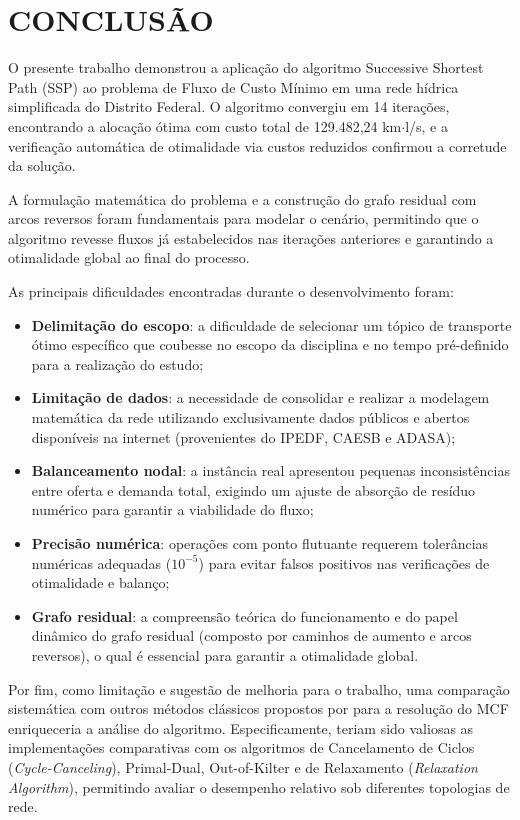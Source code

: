 \newpage

\section{CONCLUSÃO}

O presente trabalho demonstrou a aplicação do algoritmo Successive Shortest Path (SSP) ao problema de Fluxo de Custo Mínimo em uma rede hídrica simplificada do Distrito Federal. O algoritmo convergiu em 14 iterações, encontrando a alocação ótima com custo total de 129.482,24 km$\cdot$l/s, e a verificação automática de otimalidade via custos reduzidos confirmou a corretude da solução.

A formulação matemática do problema e a construção do grafo residual com arcos reversos foram fundamentais para modelar o cenário, permitindo que o algoritmo revesse fluxos já estabelecidos nas iterações anteriores e garantindo a otimalidade global ao final do processo.

As principais dificuldades encontradas durante o desenvolvimento foram:

\begin{itemize}
  \item \textbf{Delimitação do escopo}: a dificuldade de selecionar um tópico de transporte ótimo específico que coubesse no escopo da disciplina e no tempo pré-definido para a realização do estudo;
  \item \textbf{Limitação de dados}: a necessidade de consolidar e realizar a modelagem matemática da rede utilizando exclusivamente dados públicos e abertos disponíveis na internet (provenientes do IPEDF, CAESB e ADASA);
  \item \textbf{Balanceamento nodal}: a instância real apresentou pequenas inconsistências entre oferta e demanda total, exigindo um ajuste de absorção de resíduo numérico para garantir a viabilidade do fluxo;
  \item \textbf{Precisão numérica}: operações com ponto flutuante requerem tolerâncias numéricas adequadas ($10^{-5}$) para evitar falsos positivos nas verificações de otimalidade e balanço;
  \item \textbf{Grafo residual}: a compreensão teórica do funcionamento e do papel dinâmico do grafo residual (composto por caminhos de aumento e arcos reversos), o qual é essencial para garantir a otimalidade global.
\end{itemize}

Por fim, como limitação e sugestão de melhoria para o trabalho, uma comparação sistemática com outros métodos clássicos propostos por \textcite{ahuja1993network} para a resolução do MCF enriqueceria a análise do algoritmo. Especificamente, teriam sido valiosas as implementações comparativas com os algoritmos de Cancelamento de Ciclos (\textit{Cycle-Canceling}), Primal-Dual, Out-of-Kilter e de Relaxamento (\textit{Relaxation Algorithm}), permitindo avaliar o desempenho relativo sob diferentes topologias de rede.


